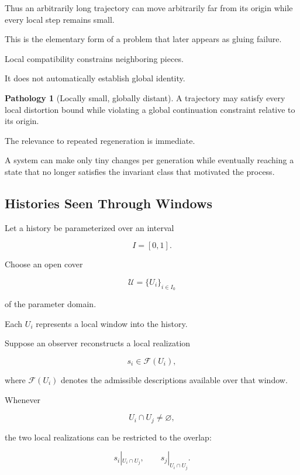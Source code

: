 \documentclass[
  11pt,
  a4paper,
  DIV=12,
  BCOR=0mm,
  parskip=half-
]{scrartcl}
\theoremstyle{definition}
\newtheorem{pathology}[definition]{Pathology}
\theoremstyle{plain}
\theoremstyle{remark}
\begin{document}
Thus an arbitrarily long trajectory can move arbitrarily far from its origin
while every local step remains small.

This is the elementary form of a problem that later appears as gluing failure.

Local compatibility constrains neighboring pieces.

It does not automatically establish global identity.

\begin{pathology}[Locally small, globally distant]
A trajectory may satisfy every local distortion bound while violating a
global continuation constraint relative to its origin.
\end{pathology}

The relevance to repeated regeneration is immediate.

A system can make only tiny changes per generation while eventually reaching a
state that no longer satisfies the invariant class that motivated the process.


\subsection{Histories Seen Through Windows}
\label{app:local-windows}

Let a history be parameterized over an interval

\[
  I=[0,1].
\]

Choose an open cover

\[
  \mathcal U
  =
  \{
    U_i
  \}_{i\in I_0}
\]

of the parameter domain.

Each \(U_i\) represents a local window into the history.

Suppose an observer reconstructs a local realization

\[
  s_i\in\mathscr F(U_i),
\]

where \(\mathscr F(U_i)\) denotes the admissible descriptions available over
that window.

Whenever

\[
  U_i\cap U_j\neq\varnothing,
\]

the two local realizations can be restricted to the overlap:

\[
  s_i|_{U_i\cap U_j},
  \qquad
  s_j|_{U_i\cap U_j}.
\]
\end{document}
